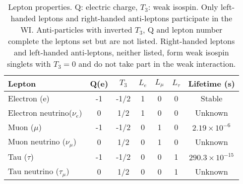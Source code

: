 



\begin{table}[h]
\centering
\footnotesize
\begin{tabular}{lcccccc} \hline
Lepton                      & Q(e) & $T_3$&$L_e$ & $L_\mu$ & $L_\tau$ & Lifetime (s)                \\ \hline
Electron (e)                & -1   & -1/2 & 1    & 0       & 0        & Stable                      \\ %
Electron neutrino($\nu_e$)  & 0    &  1/2 & 1    & 0       & 0        & Unknown                     \\ %
Muon ($\mu$)                & -1   & -1/2 & 0    & 1       & 0        & $2.19\times10^{-6}$\\ %
Muon neutrino ($\nu_\mu$)   & 0    &  1/2 & 0    & 1       & 0        & Unknown                     \\ %
Tau ($\tau$)                & -1   & -1/2 & 0    & 0       & 1        & $290.3\times10^{-15}$    \\ %
Tau neutrino ($\tau_\mu$)   & 0    &  1/2 & 0    & 0       & 1        & Unknown                     \\ \hline
\end{tabular}
\caption[Lepton properties.]{Lepton properties\cite{pdg}. Q: electric charge, $T_3$: weak isospin. Only left-handed leptons and right-handed anti-leptons participate in the WI. Anti-particles with inverted $T_3$, Q and lepton number complete the leptons set but are not listed. Right-handed leptons and left-handed anti-leptons, neither listed, form weak isospin singlets with $T_3=0$ and do not take part in the weak interaction.}\label{leptons}
\end{table}

